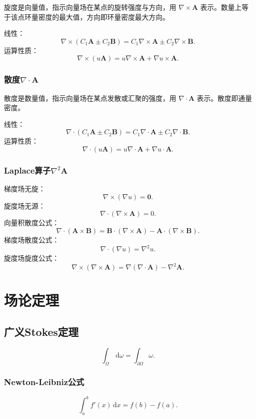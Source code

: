 \documentclass[UTF8,fontset=fandol,zihao=5]{ctexart}
\newcommand{\dd}{\,\mathrm{d}}
\let\bm\boldsymbol
\begin{document}
旋度是向量值，指示向量场在某点的旋转强度与方向，用 $\nabla\times\bm A$ 表示。数量上等于该点环量密度的最大值，方向即环量密度最大方向。

线性：
\[
\nabla\times(C_1\bm A\pm C_2\bm B)
=C_1\nabla\times\bm A\pm C_2\nabla\times\bm B.
\]
运算性质：
\[
\nabla\times(u\bm A)=u\nabla\times\bm A+\nabla u\times\bm A.
\]

\subsubsection{散度$\nabla\cdot\bm A$}

散度是数量值，指示向量场在某点发散或汇聚的强度，用 $\nabla\cdot\bm A$ 表示。散度即通量密度。

线性：
\[
\nabla\cdot(C_1\bm A\pm C_2\bm B)
=C_1\nabla\cdot\bm A\pm C_2\nabla\cdot\bm B.
\]
运算性质：
\[
\nabla\cdot(u\bm A)=u\nabla\cdot\bm A+\nabla u\cdot\bm A.
\]

\subsubsection{Laplace算子$\nabla^2\bm A$}

\begin{methodbox}[常用公式]
	梯度场无旋：
	\[
	\nabla\times(\nabla u)=\bm0.
	\]
	旋度场无源：
	\[
	\nabla\cdot(\nabla\times\bm A)=0.
	\]
	向量积散度公式：
	\[
	\nabla\cdot(\bm A\times\bm B)
	=\bm B\cdot(\nabla\times\bm A)-\bm A\cdot(\nabla\times\bm B).
	\]
	梯度场散度公式：
	\[
	\nabla\cdot(\nabla u)=\nabla^2u.
	\]
	旋度场旋度公式：
	\[
	\nabla\times(\nabla\times\bm A)
	=\nabla(\nabla\cdot\bm A)-\nabla^2\bm A.
	\]
\end{methodbox}

\section{场论定理}

\subsection{广义Stokes定理}

\[
\int_{\varOmega}\dd\omega=\int_{\partial\varOmega}\omega.
\]

\subsubsection{Newton-Leibniz公式}

\[
\int_{a}^{b}f'(x)\dd x=f(b)-f(a).
\]
\end{document}
